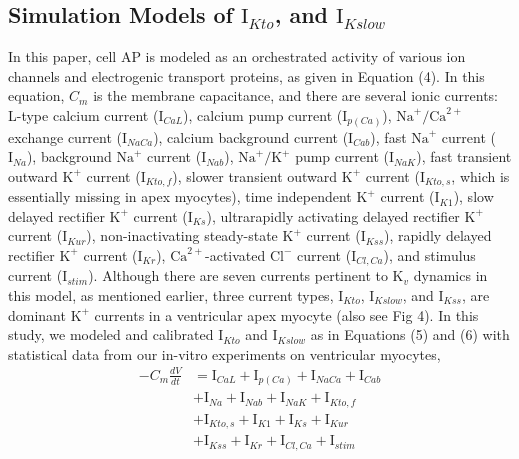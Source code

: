 \documentclass[10pt,letterpaper]{article}
\begin{document}
\subsection*{Simulation Models of $\text{I}_{Kto}$, and $\text{I}_{Kslow}$}
In this paper, cell AP is modeled as an orchestrated activity of various ion channels and electrogenic transport proteins, as given in Equation (4). In this equation, $C_m$ is the membrane capacitance, and there are several ionic currents: L-type calcium current ($\text{I}_{CaL}$), calcium pump current ($\text{I}_{p(Ca)}$), $\text{Na}^{+}/\text{Ca}^{2+}$ exchange current ($\text{I}_{NaCa}$), calcium background current ($\text{I}_{Cab}$), fast $\text{Na}^{+}$ current ($\text{I}_{Na}$), background $\text{Na}^{+}$ current ($\text{I}_{Nab}$), $\text{Na}^{+}/\text{K}^{+}$ pump current ($\text{I}_{NaK}$), fast transient outward $\text{K}^{+}$ current ($\text{I}_{Kto,f}$), slower transient outward $\text{K}^{+}$ current ($\text{I}_{Kto,s}$, which is essentially missing in apex myocytes), time independent $\text{K}^{+}$ current ($\text{I}_{K1}$), slow delayed rectifier $\text{K}^{+}$ current ($\text{I}_{Ks}$), ultrarapidly activating delayed rectifier $\text{K}^{+}$ current ($\text{I}_{Kur}$), non-inactivating steady-state $\text{K}^{+}$ current ($\text{I}_{Kss}$), rapidly delayed rectifier $\text{K}^{+}$ current ($\text{I}_{Kr}$), $\text{Ca}^{2+}$-activated $\text{Cl}^{-}$ current ($\text{I}_{Cl,Ca}$), and stimulus current ($\text{I}_{stim}$). Although there are seven currents pertinent to $\text{K}_{v}$ dynamics in this model, as mentioned earlier, three current types, $\text{I}_{Kto}$, $\text{I}_{Kslow}$, and $\text{I}_{Kss}$, are dominant $\text{K}^{+}$ currents in a ventricular apex myocyte \cite{nerbonne2005molecular} (also see Fig 4). In this study, we modeled and calibrated $\text{I}_{Kto}$ and $\text{I}_{Kslow}$ as in Equations (5) and (6) with statistical data from our in-vitro experiments on ventricular myocytes,
\begin{equation}
\begin{split}
    -C_{m}\frac{dV}{dt} &= \text{I}_{CaL}+\text{I}_{p(Ca)}+\text{I}_{NaCa}+\text{I}_{Cab}\\
    &+\text{I}_{Na}+\text{I}_{Nab}+\text{I}_{NaK}+\text{I}_{Kto,f}\\
    &+\text{I}_{Kto,s}+\text{I}_{K1}+\text{I}_{Ks}+\text{I}_{Kur}\\
    &+\text{I}_{Kss}+\text{I}_{Kr}+\text{I}_{Cl,Ca}+\text{I}_{stim}
\end{split}
\end{equation}
\end{document}
